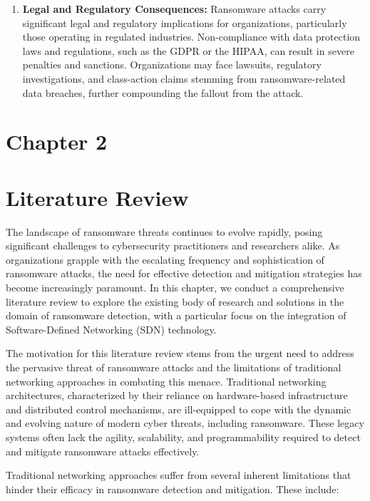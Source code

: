 \documentclass[12pt,letterpaper]{article}
\begin{document}
\begin{enumerate}
            \item \textbf{Legal and Regulatory Consequences:} Ransomware attacks carry significant legal and regulatory implications for organizations, particularly those operating in regulated industries. Non-compliance with data protection laws and regulations, such as the \ac{GDPR} or the \ac{HIPAA}, can result in severe penalties and sanctions. Organizations may face lawsuits, regulatory investigations, and class-action claims stemming from ransomware-related data breaches, further compounding the fallout from the attack.
        \end{enumerate}

    \clearpage

\newpage
{}
\section*{Chapter 2}
    \section{Literature Review}

    The landscape of ransomware threats continues to evolve rapidly, posing significant challenges to cybersecurity practitioners and researchers alike. As organizations grapple with the escalating frequency and sophistication of ransomware attacks, the need for effective detection and mitigation strategies has become increasingly paramount. In this chapter, we conduct a comprehensive literature review to explore the existing body of research and solutions in the domain of ransomware detection, with a particular focus on the integration of Software-Defined Networking (SDN) technology.

    The motivation for this literature review stems from the urgent need to address the pervasive threat of ransomware attacks and the limitations of traditional networking approaches in combating this menace. Traditional networking architectures, characterized by their reliance on hardware-based infrastructure and distributed control mechanisms, are ill-equipped to cope with the dynamic and evolving nature of modern cyber threats, including ransomware. These legacy systems often lack the agility, scalability, and programmability required to detect and mitigate ransomware attacks effectively.

    Traditional networking approaches suffer from several inherent limitations that hinder their efficacy in ransomware detection and mitigation. These include:
\end{document}

